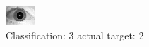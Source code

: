 \begin{figure}[h!]
\begin{center}
\includegraphics[width=0.60\columnwidth]{figures/ID1715_class_3_target_2.png}
\end{center}
\caption{ Classification: 3 actual target: 2}
\label{fig:ID1715_class_3_target_2}
\end{figure}
